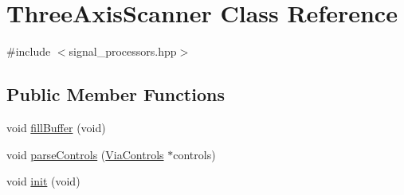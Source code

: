 \hypertarget{class_three_axis_scanner}{}\section{Three\+Axis\+Scanner Class Reference}
\label{class_three_axis_scanner}


{\ttfamily \#include $<$signal\+\_\+processors.\+hpp$>$}

\subsection*{Public Member Functions}
\begin{DoxyCompactItemize}
\item 
void \mbox{\hyperlink{class_three_axis_scanner_a4db94f0a424eeebb35b87e3ea74050dc}{fill\+Buffer}} (void)
\item 
void \mbox{\hyperlink{class_three_axis_scanner_a3e4843f929d7acfff7b4ff78989af686}{parse\+Controls}} (\mbox{\hyperlink{class_via_controls}{Via\+Controls}} $\ast$controls)
\item 
void \mbox{\hyperlink{class_three_axis_scanner_a68093cb4dc011a3c91084b8bba61315c}{init}} (void)
\end{DoxyCompactItemize}
